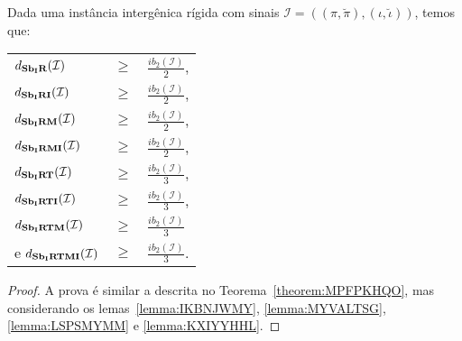 \begin{theorem}\label{theorem:NFVKZGKW}
Dada uma instância intergênica rígida com sinais $\mathcal{I}=((\pi,\breve\pi),(\iota,\breve\iota))$, temos que:

\begin{tabular}{lll}
  $d_{\textbf{Sb\textsubscript{I}R}}(\mathcal{I})$      & $ \ge $ & $\frac{ib_2(\mathcal{I})}{2}$, \\ 
  $d_{\textbf{Sb\textsubscript{I}RI}}(\mathcal{I})$     & $ \ge $ & $\frac{ib_2(\mathcal{I})}{2}$, \\
  $d_{\textbf{Sb\textsubscript{I}RM}}(\mathcal{I})$     & $ \ge $ & $\frac{ib_2(\mathcal{I})}{2}$, \\
  $d_{\textbf{Sb\textsubscript{I}RMI}}(\mathcal{I})$    & $ \ge $ & $\frac{ib_2(\mathcal{I})}{2}$, \\
  $d_{\textbf{Sb\textsubscript{I}RT}}(\mathcal{I})$     & $ \ge $ & $\frac{ib_2(\mathcal{I})}{3}$, \\
  $d_{\textbf{Sb\textsubscript{I}RTI}}(\mathcal{I})$    & $ \ge $ & $\frac{ib_2(\mathcal{I})}{3}$, \\
  $d_{\textbf{Sb\textsubscript{I}RTM}}(\mathcal{I})$    & $ \ge $ & $\frac{ib_2(\mathcal{I})}{3}$  \\
  e $d_{\textbf{Sb\textsubscript{I}RTMI}}(\mathcal{I})$ & $ \ge $ & $\frac{ib_2(\mathcal{I})}{3}$. \\
\end{tabular}
\end{theorem}
\begin{proof}
A prova é similar a descrita no Teorema~\ref{theorem:MPFPKHQO}, mas considerando os lemas~\ref{lemma:IKBNJWMY}, \ref{lemma:MYVALTSG}, \ref{lemma:LSPSMYMM} e \ref{lemma:KXIYYHHL}.
\end{proof}

